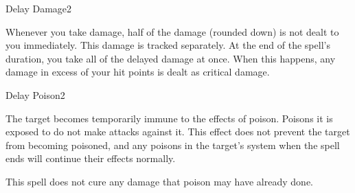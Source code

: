 \begin{spellsection}{Delay Damage}{2}
\begin{spellheader}
\end{spellheader}
\begin{spellcontent}
    \begin{spelltargetinginfo}
    \end{spelltargetinginfo}
    \begin{spelleffects}
        \spelleffect Whenever you take damage, half of the damage (rounded down) is not dealt to you immediately. This damage is tracked separately. At the end of the spell's duration, you take all of the delayed damage at once. When this happens, any damage in excess of your hit points is dealt as critical damage.
        \spelldur \durmed
    \end{spelleffects}
\end{spellcontent}
\begin{spellfooter}
\end{spellfooter}
\end{spellsection}

\begin{spellsection}{Delay Poison}{2}
\begin{spellheader}
\end{spellheader}
\begin{spellcontent}
    \begin{spelltargetinginfo}
    \end{spelltargetinginfo}
    \begin{spelleffects}
        \spelleffect The target becomes temporarily immune to the effects of poison. Poisons it is exposed to do not make attacks against it. This effect does not prevent the target from becoming poisoned, and any poisons in the target's system when the spell ends will continue their effects normally. 
        \spelldur \durshort
    \end{spelleffects}
\end{spellcontent}
\begin{spellfooter}
    \spellnotes This spell does not cure any damage that poison may have already done.
\end{spellfooter}
\end{spellsection}

